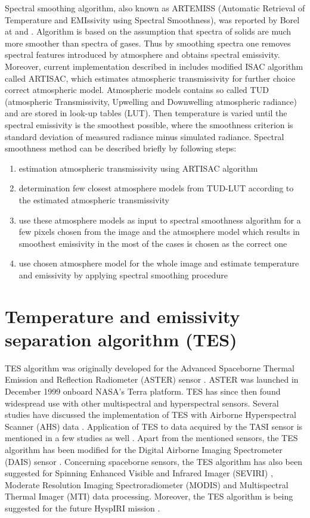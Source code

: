 Spectral smoothing algorithm, also known as ARTEMISS (Automatic Retrieval of Temperature and EMIssivity using Spectral Smoothness), was reported by Borel at \cite{B98} and \cite{B08}. Algorithm is based on the assumption that spectra of solids are much more smoother than spectra of gases. Thus by smoothing spectra one removes spectral features introduced by atmosphere and obtains spectral emissivity. Moreover, current implementation described in \cite{B08} includes modified ISAC algorithm called ARTISAC, which estimates atmospheric transmissivity for further choice correct atmospheric model. Atmospheric models contains so called TUD (atmospheric Transmissivity, Upwelling and Downwelling atmospheric radiance) and are stored in look-up tables (LUT). Then temperature is varied until the spectral emissivity is the smoothest possible, where the smoothness criterion is standard deviation of measured radiance minus simulated radiance. Spectral smoothness method can be described briefly by following steps:
\begin{enumerate}
	\item estimation atmospheric transmissivity using ARTISAC algorithm
	\item determination few closest atmosphere models from TUD-LUT according to the estimated atmospheric transmissivity
	\item use these atmosphere models as input to spectral smoothness algorithm for a few pixels chosen from the image and the atmosphere model which results in smoothest emissivity in the most of the cases is chosen as the correct one
	\item use chosen atmosphere model for the whole image and estimate temperature and emissivity by applying spectral smoothing procedure
\end{enumerate}

\section{Temperature and emissivity separation algorithm (TES)}

TES algorithm was originally developed for the Advanced Spaceborne Thermal Emission and Reflection Radiometer (ASTER) sensor \cite{GR98}. ASTER was launched in December 1999 onboard NASA's Terra platform. TES has since then found widespread use with other multispectral and hyperspectral sensors. Several studies have discussed the implementation of TES with Airborne Hyperspectral Scanner (AHS) data \cite{SJ06, JS12}. Application of TES to data acquired by the TASI sensor is mentioned in a few studies as well \cite{WX11, PP12}. Apart from the mentioned sensors, the TES algorithm has been modified for the Digital Airborne Imaging Spectrometer (DAIS) sensor \cite{SJ02}. Concerning spaceborne sensors, the TES algorithm has also been suggested for Spinning Enhanced Visible and Infrared Imager (SEVIRI) \cite{JS14}, Moderate Resolution Imaging Spectroradiometer (MODIS) \cite{HH11} and Multispectral Thermal Imager (MTI) \cite{MB02} data processing. Moreover, the TES algorithm is being suggested for the future HyspIRI mission \cite{HH11-2}.

